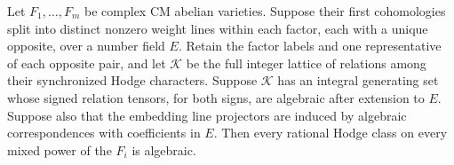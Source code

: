 \begin{lemma}\label{ext:lem:contraction}
Let $F_1,\ldots,F_m$ be complex CM abelian varieties. Suppose their
first cohomologies split into distinct nonzero weight lines within
each factor, each with a unique opposite, over a number field $E$.
Retain the factor labels and one representative of each opposite pair,
and let $\mathcal K$ be the full integer lattice of relations among
their synchronized Hodge characters. Suppose $\mathcal K$ has an
integral generating set whose signed relation tensors, for both signs,
are algebraic after extension to $E$. Suppose also that the embedding
line projectors are induced by algebraic correspondences with coefficients
in $E$. Then every rational Hodge class on every mixed power of the
$F_i$ is algebraic.
\end{lemma}
